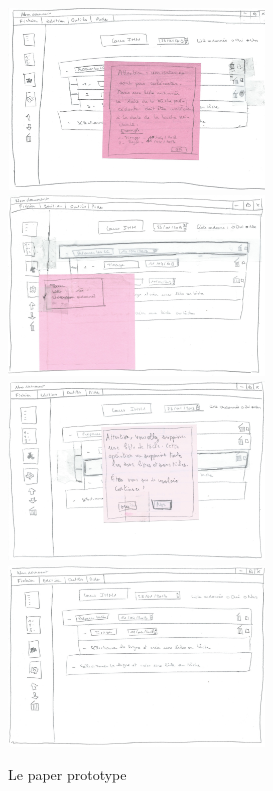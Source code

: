 \documentclass[a4paper,10pt]{article}
\begin{document}
\begin{figure}[H]
    \includegraphics[width=6.8cm]{Images/maquette5.jpeg}
    \includegraphics[width=6.8cm]{Images/maquette6.jpeg}
    \includegraphics[width=6.8cm]{Images/maquette7.jpeg}
    \includegraphics[width=6.8cm]{Images/maquette8.jpeg}
    \caption{Le paper prototype}
\end{figure}
\end{document}
